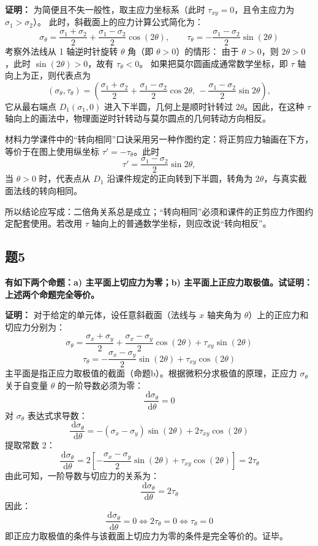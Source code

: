 \documentclass[11pt,a4paper]{ctexrep}
\newcommand{\diff}{\,\mathrm{d}}
\begin{document}
{\textbf{证明：}
为简便且不失一般性，取主应力坐标系（此时 $\tau_{xy} = 0$，且令主应力为 $\sigma_1 > \sigma_2$）。
此时，斜截面上的应力计算公式简化为：
\[
    \sigma_\theta = \frac{\sigma_1 + \sigma_2}{2} + \frac{\sigma_1 - \sigma_2}{2} \cos(2\theta), \qquad \tau_\theta = -\frac{\sigma_1 - \sigma_2}{2} \sin(2\theta)
\]
考察外法线从 1 轴逆时针旋转 $\theta$ 角（即 $\theta > 0$）的情形：
由于 $\theta > 0$，则 $2\theta > 0$，此时 $\sin(2\theta) > 0$，故有 $\tau_\theta < 0$。
如果把莫尔圆画成通常数学坐标，即 $\tau$ 轴向上为正，则代表点为
\[
    (\sigma_\theta,\tau_\theta)
    =
    \left(
    \frac{\sigma_1+\sigma_2}{2}
    +\frac{\sigma_1-\sigma_2}{2}\cos2\theta,\,
    -\frac{\sigma_1-\sigma_2}{2}\sin2\theta
    \right),
\]
它从最右端点 $D_1(\sigma_1,0)$ 进入下半圆，几何上是顺时针转过 $2\theta$。因此，在这种 $\tau$ 轴向上的画法中，物理面逆时针转动与莫尔圆点的几何转动方向相反。

材料力学课件中的“转向相同”口诀采用另一种作图约定：将正剪应力轴画在下方，等价于在图上使用纵坐标 $\tau'=-\tau_\theta$。此时
\[
    \tau'=\frac{\sigma_1-\sigma_2}{2}\sin2\theta,
\]
当 $\theta>0$ 时，代表点从 $D_1$ 沿课件规定的正向转到下半圆，转角为 $2\theta$，与真实截面法线的转向相同。

所以结论应写成：二倍角关系总是成立；“转向相同”必须和课件的正剪应力作图约定配套使用。若改用 $\tau$ 轴向上的普通数学坐标，则应改说“转向相反”。

\subsection*{题5}
\textbf{有如下两个命题：a) 主平面上切应力为零；b) 主平面上正应力取极值。试证明：上述两个命题完全等价。}

\textbf{证明：}
对于给定的单元体，设任意斜截面（法线与 $x$ 轴夹角为 $\theta$）上的正应力和切应力分别为：
\[
    \sigma_\theta = \frac{\sigma_x + \sigma_y}{2} + \frac{\sigma_x - \sigma_y}{2} \cos(2\theta) + \tau_{xy} \sin(2\theta)
\]
\[
    \tau_\theta = -\frac{\sigma_x - \sigma_y}{2} \sin(2\theta) + \tau_{xy} \cos(2\theta)
\]
主平面是指正应力取极值的截面（命题b）。根据微积分求极值的原理，正应力 $\sigma_\theta$ 关于自变量 $\theta$ 的一阶导数必须为零：
\[
    \frac{\diff \sigma_\theta}{\diff \theta} = 0
\]
对 $\sigma_\theta$ 表达式求导数：
\[
    \frac{\diff \sigma_\theta}{\diff \theta} = -(\sigma_x - \sigma_y) \sin(2\theta) + 2\tau_{xy} \cos(2\theta)
\]
提取常数 2：
\[
    \frac{\diff \sigma_\theta}{\diff \theta} = 2 \left[ -\frac{\sigma_x - \sigma_y}{2} \sin(2\theta) + \tau_{xy} \cos(2\theta) \right] = 2\tau_\theta
\]
由此可知，一阶导数与切应力的关系为：
\[
    \frac{\diff \sigma_\theta}{\diff \theta} = 2\tau_\theta
\]
因此：
\[
    \frac{\diff \sigma_\theta}{\diff \theta} = 0 \iff 2\tau_\theta = 0 \iff \tau_\theta = 0
\]
即正应力取极值的条件与该截面上切应力为零的条件是完全等价的。证毕。

}
\end{document}
